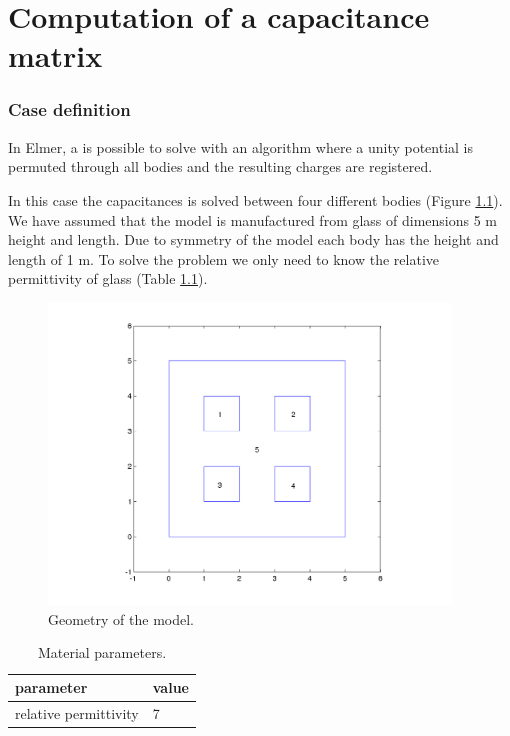 \chapter{Computation of a capacitance matrix}



\subsection*{Case definition}

\begin{flushleft}

In Elmer, a  is possible to solve with an algorithm where a unity potential is permuted through 
all bodies and the resulting charges are registered. 

In this case the capacitances is solved between four different bodies (Figure \ref{fg:4holegeometry}). We have assumed that the model is manufactured from glass of dimensions 5 m height and length. Due to symmetry of the model each body has the height and length of 1 m. To solve the problem we only need to know the relative permittivity of glass (Table \ref{tb:glasspar}).

\begin{figure}[h]
\centering
\includegraphics[height=80mm]{4holegeometry}
\caption{Geometry of the model.}\label{fg:4holegeometry}
\end{figure}


\begin{table}[h]
\caption{Material parameters.}
\label{tb:glasspar}
\begin{center}
\begin{tabular}{ll} \hline
parameter  & value \\ \hline
relative permittivity & 7      \\ \hline
\end{tabular}
\end{center}
\end{table} 


\end{flushleft}

